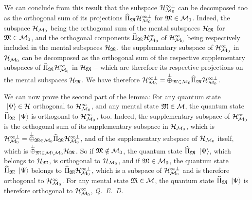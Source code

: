  We can conclude from this result that the subspace $\mathcal H_{\mathcal M_0}^{\infty \perp}$ can be decomposed too as the orthogonal sum of its projections $\widehat{\Pi}_{\mathfrak{M}} \mathcal H_{\mathcal M_0}^{\infty \perp}$ for $\mathfrak{M} \in \mathcal M_0$. Indeed, the subspace $\mathcal H_{\mathcal M_0}$ being the orthogonal sum of the mental subspaces $\mathcal H_{\mathfrak{M}}$ for $\mathfrak{M} \in \mathcal M_0$, and the orthogonal components $\widehat{\Pi}_{\mathfrak{M}} \mathcal H_{\mathcal M_0}^\infty$ of $\mathcal H_{\mathcal M_0}^\infty$ being respectively included in the mental subspaces $\mathcal H_{\mathfrak{M}}$, the supplemantary subspace of $\mathcal H_{\mathcal M_0}^\infty$ in $\mathcal H_{\mathcal M_0}$ can be decomposed as the orthogonal sum of the respective supplementary subspaces of $\widehat{\Pi}_{\mathfrak{M}} \mathcal H_{\mathcal M_0}^\infty$ in $\mathcal H_{\mathfrak{M}}$ -- which are therefore its respective projections on the mental subspaces $\mathcal H_{\mathfrak{M}}$. We have therefore $\mathcal H_{\mathcal M_0}^{\infty \perp} = \overset{\perp}{\oplus}_{\mathfrak{M} \in \mathcal M_0} \widehat{\Pi}_{\mathfrak{M}} \mathcal H_{\mathcal M_0}^{\infty \perp}$.

 We can now prove the second part of the lemma: For any quantum state $\ \left|{\Psi}\right\rangle \in \mathcal H$ orthogonal to $\mathcal H_{\mathcal M_0}^\infty$, and any mental state $\mathfrak{M} \in \mathcal M$, the quantum state $\widehat{\Pi}_{\mathfrak{M}} \ \left|{\Psi}\right\rangle$ is orthogonal to $\mathcal H_{\mathcal M_0}^\infty$, too. Indeed, the supplementary subspace of $\mathcal H_{\mathcal M_0}^\infty$ is the orthogonal sum of its supplementary subspace in $\mathcal H_{\mathcal M_0}$, which is $\mathcal H_{\mathcal M_0}^{\infty \perp} = \overset{\perp}{\oplus}_{\mathfrak{M} \in \mathcal M_0} \widehat{\Pi}_{\mathfrak{M}} \mathcal H_{\mathcal M_0}^{\infty \perp}$, and of the supplementary subspace of $\mathcal H_{\mathcal M_0}$ itself, which is $\overset{\perp}{\oplus}_{\mathfrak{M} \in \mathcal M \setminus \mathcal M_0} \mathcal H_{\mathfrak{M}}$. So if $\mathfrak{M} \notin \mathcal M_0$, the quantum state $\widehat{\Pi}_{\mathfrak{M}} \ \left|{\Psi}\right\rangle$, which belongs to $\mathcal H_{\mathfrak{M}}$, is orthogonal to $\mathcal H_{\mathcal M_0}$, and if $\mathfrak{M} \in \mathcal M_0$, the quantum state $\widehat{\Pi}_{\mathfrak{M}} \ \left|{\Psi}\right\rangle$ belongs to $\widehat{\Pi}_{\mathfrak{M}} \mathcal H_{\mathcal M_0}^{\infty \perp}$, which is a subspace of $\mathcal H_{\mathcal M_0}^{\infty \perp}$ and is therefore orthogonal to $\mathcal H_{\mathcal M_0}^\infty$. For any mental state $\mathfrak{M} \in \mathcal M$, the quantum state $\widehat{\Pi}_{\mathfrak{M}} \ \left|{\Psi}\right\rangle$ is therefore orthogonal to $\mathcal H_{\mathcal M_0}^\infty$, \textit{Q.~E.~D.}

